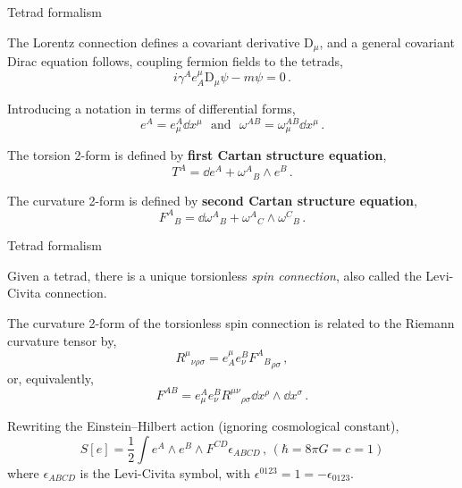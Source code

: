 \documentclass[12pt,titlepage]{article}
\begin{document}
\begin{frame}{Tetrad formalism}
    \begin{list}{\,}{\leftmargin=1em \itemindent=0em}
        \item<1-> The Lorentz connection defines a covariant derivative $\text{D}_\mu$, and a general covariant Dirac equation follows, coupling fermion fields to the tetrads,
        \begin{equation}\label{curved_Dirac}
            i\gamma^A e^\mu_A\text{D}_\mu \psi-m\psi=0\,.
        \end{equation}
        \item<2-> Introducing a notation in terms of differential forms,
        \begin{equation}
            e^A=e_\mu^A\dd{x^\mu}\,\,\,\,\text{and}\,\,\,\,\omega^{AB}=\omega_\mu^{AB}\dd{x^\mu}\,.
        \end{equation}
        \item<3-> The torsion 2-form is defined by \textbf{first Cartan  structure equation},
        \begin{equation}\label{cartan1}
            T^A=\dd{e^A}+{\omega^A}_B\wedge e^B\,.
        \end{equation}
        \item<4-> The curvature 2-form is defined by \textbf{second Cartan structure equation},
        \begin{equation}\label{cartan2}
            {F^A}_B=\dd{{\omega^A}_B}+{\omega^A}_C\wedge {\omega^C}_B\,.
        \end{equation}
    \end{list}
\end{frame}

\begin{frame}{Tetrad formalism}
    \begin{list}{\,}{\leftmargin=1em \itemindent=0em}
        \item<1-> Given a tetrad, there is a unique torsionless \textit{spin connection}, also called the Levi-Civita connection.
        \item<2-> The curvature 2-form of the torsionless spin connection is related to the Riemann curvature tensor by,
        \begin{equation}
            {R^\mu}_{\nu\rho\sigma}=e^\mu_A e_\nu^B {{F^A}_B}_{\rho\sigma}\,,
        \end{equation}
        or, equivalently,
        \begin{equation}
            F^{AB}=e_\mu^A e_\nu^B {R^{\mu\nu}}_{\rho\sigma} \dd{x^\rho}\wedge\dd{x^\sigma}\,.
        \end{equation}
        \item<3-> Rewriting the Einstein–Hilbert action (ignoring cosmological constant),
        \begin{equation}\label{action_wedge1}
            S[e]=\frac{1}{2}\int e^A\wedge e^B\wedge F^{CD}\epsilon_{ABCD}\,, \,(\hbar=8\pi G=c=1)
        \end{equation}
        where $\epsilon_{ABCD}$ is the Levi-Civita symbol, with $\epsilon^{0123}=1=-\epsilon_{0123}$.
    \end{list}
\end{frame}
\end{document}
